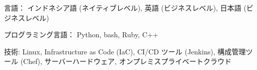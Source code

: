 

\begin{cvparagraph}

\begin{cvbullets}
    \item 言語： インドネシア語 (ネイティブレベル), 英語 (ビジネスレベル), 日本語 (ビジネスレベル)
    \item プログラミング言語：  Python, bash, Ruby, C++
    \item 技術: Linux, Infrastructure as Code (IaC), CI/CD ツール (Jenkins), 構成管理ツール (Chef), サーバーハードウェア, オンプレミスプライベートクラウド
\end{cvbullets}
\end{cvparagraph}
